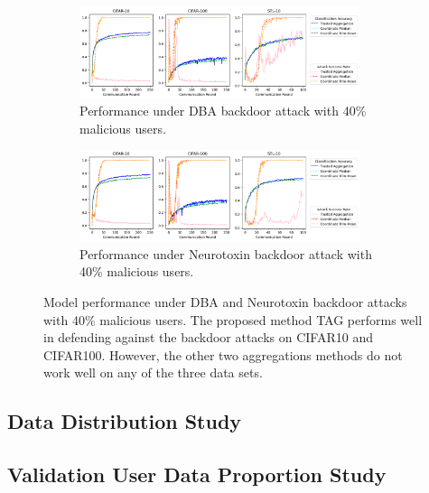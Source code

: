 \documentclass{article} %
\begin{document}
\begin{figure}
\vspace{-10pt}
  \begin{subfigure}{\textwidth}
    \includegraphics[width=0.9\textwidth]{make_article/make_visuals/visuals/accuracy--n_malicious4--dba1--beta0.2.png}
    \caption{\footnotesize Performance under DBA backdoor attack with 40\% malicious users.}
  \end{subfigure}%

  \begin{subfigure}{\textwidth}
    \includegraphics[width=0.9\textwidth]{make_article/make_visuals/visuals/accuracy--n_malicious4--dba1--beta0.2--neuro_p0.1.png}
    \caption{\footnotesize Performance under Neurotoxin backdoor attack with 40\% malicious users.}
  \end{subfigure}%
 \vspace{-5pt}
\caption{\footnotesize Model performance under DBA and Neurotoxin backdoor attacks with 40\% malicious users. The proposed method TAG performs well in defending against the backdoor attacks on CIFAR10 and CIFAR100. However, the other two aggregations methods do not work well on any of the three data sets.} 
\label{fig: accuracy--n_malicious4}
\vspace{-10pt}
\end{figure}


\subsection{Data Distribution Study}


\subsection{Validation User Data Proportion Study}
\end{document}
